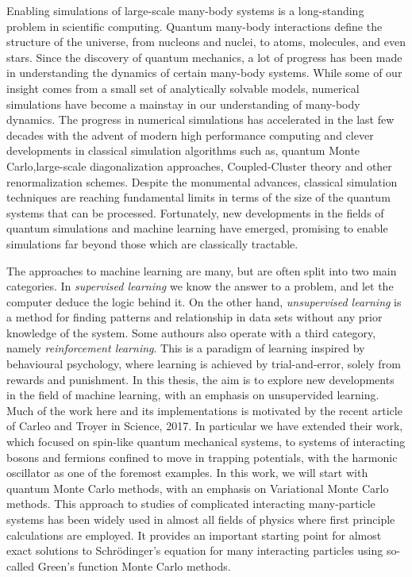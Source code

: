 \documentclass[10pt]{article}
\begin{document}
Enabling simulations of large-scale many-body systems is a
long-standing problem in scientific computing.  Quantum many-body
interactions define the structure of the universe, from nucleons and
nuclei, to atoms, molecules, and even stars. Since the discovery of
quantum mechanics, a lot of progress has been made in understanding
the dynamics of certain many-body systems. While some of our insight
comes from a small set of analytically solvable models, numerical
simulations have become a mainstay in our understanding of many-body
dynamics. The progress in numerical simulations has accelerated in the
last few decades with the advent of modern high performance computing
 and clever developments in classical simulation algorithms such
as, quantum Monte Carlo,large-scale diagonalization approaches,
Coupled-Cluster theory and other renormalization schemes.  Despite the
monumental advances, classical simulation techniques are reaching
fundamental limits in terms of the size of the quantum systems that
can be processed. Fortunately, new developments in the fields of quantum
simulations and machine learning have emerged, promising to enable simulations far beyond
those which are classically tractable. 


The approaches to machine learning are many, but are often split into
two main categories.  In {\em supervised learning} we know the answer
to a problem, and let the computer deduce the logic behind it. On the
other hand, {\em unsupervised learning} is a method for finding
patterns and relationship in data sets without any prior knowledge of
the system.  Some authours also operate with a third category, namely
{\em reinforcement learning}. This is a paradigm of learning inspired
by behavioural psychology, where learning is achieved by
trial-and-error, solely from rewards and punishment.  In this thesis,
the aim is to explore new developments in the field of machine 
learning, with an emphasis on unsupervided learning. Much of the work
here and its implementations is motivated by the recent article of
Carleo and Troyer in Science, 2017. In particular we have extended
their work, which focused on spin-like quantum mechanical systems, to
systems of interacting bosons and fermions confined to move in
trapping potentials, with the harmonic oscillator as one of the
foremost examples.  
In this work, we will start with quantum Monte Carlo methods,
with an emphasis on Variational Monte Carlo methods.  This approach to
studies of complicated interacting many-particle systems has been
widely used in almost all fields of physics where first principle calculations are 
employed. It provides an important starting  point
for almost exact solutions to Schr\"odinger's equation for many
interacting particles using so-called Green's function Monte Carlo methods.
\end{document}
